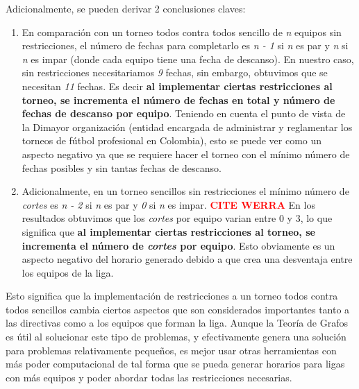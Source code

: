 \documentclass[11pt]{article}
\begin{document}
\begin{multicols}{2}
            Adicionalmente, se pueden derivar 2 conclusiones claves:
            \begin{enumerate}
                \item En comparación con un torneo todos contra todos sencillo de \textit{n} equipos sin restricciones, el número de fechas para completarlo es \textit{n - 1} si \textit{n} es par y \textit{n} si \textit{n} es impar (donde cada equipo tiene una fecha de descanso).
                En nuestro caso, sin restricciones necesitariamos \textit{9} fechas, sin embargo, obtuvimos que se necesitan \textit{11} fechas. Es decir \textbf{al implementar ciertas restricciones al torneo, se incrementa el número de fechas en total y número de fechas de descanso por equipo}.
                Teniendo en cuenta el punto de vista de la Dimayor organización (entidad encargada de administrar y reglamentar los torneos de fútbol profesional en Colombia), 
                esto se puede ver como un aspecto negativo ya que se requiere hacer el torneo con el mínimo número de fechas posibles y sin tantas fechas de descanso.
                \item Adicionalmente, en un torneo sencillos sin restricciones el mínimo número de \textit{cortes} es \textit{n - 2} si \textit{n} es par y \textit{0} si \textit{n} es impar. \textcolor{red}{\textbf{CITE WERRA}} 
                En los resultados obtuvimos que los \textit{cortes} por equipo varian entre 0 y 3, lo que significa que \textbf{al implementar ciertas restricciones al torneo, se incrementa el número de \textit{cortes} por equipo}.
                Esto obviamente es un aspecto negativo del horario generado debido a que crea una desventaja entre los equipos de la liga.             
            \end{enumerate}
            
            Esto significa que la implementación de restricciones a un torneo todos contra todos sencillos cambia ciertos aspectos que son considerados importantes tanto a las directivas como a los equipos que forman la liga.
            Aunque la Teoría de Grafos es útil al solucionar este tipo de problemas, y efectivamente genera una solución para problemas relativamente pequeños, es mejor usar otras herramientas con más poder computacional de 
            tal forma que se pueda generar horarios para ligas con más equipos y poder abordar todas las restricciones necesarias.  
            
        
        

    \end{multicols}
\end{document}
